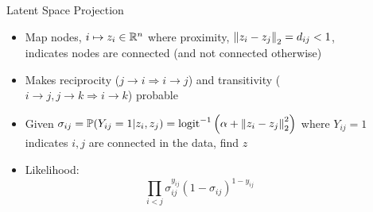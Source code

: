 \documentclass[final]{beamer}
\newlength{\sepwid}
\newlength{\onecolwid}
\newlength{\twocolwid}
\begin{document}
\begin{frame}[t]
\begin{columns}[t]
\begin{column}{\onecolwid}


\end{column} %

\begin{column}{\sepwid}\end{column} %

\begin{column}{\twocolwid} %

\begin{columns}[t,totalwidth=\twocolwid] %

\begin{column}{\onecolwid}\vspace{-.6in} %


  \begin{block}{Latent Space Projection}
    \begin{itemize}
    \item Map nodes, $i\mapsto z_i\in\mathbb{R}^n$ where proximity,
    $\left\|z_i-z_j\right\|_2=d_{ij}<1$, indicates nodes are connected (and not
    connected otherwise)
    \item Makes reciprocity ($j\rightarrow i\Rightarrow i\rightarrow j$) and
    transitivity ($i\rightarrow j, j\rightarrow k\Rightarrow
    i\rightarrow k$) probable
  \item Given $\sigma_{ij} = \mathbb{P}(Y_{ij}=1|z_i,z_j) = \textrm{logit}^{-1}\left(\alpha + \left\|z_i-z_j\right\|_2^2\right)$
    where $Y_{ij}=1$ indicates $i,j$ are connected in the data, find $z$
  \item Likelihood:
    \[\prod_{i<j} \sigma_{ij}^{y_{ij}}(1- \sigma_{ij})^{1-y_{ij}}\]
  \end{itemize}





\end{block}
\end{column}
\end{columns}
\end{column}
\end{columns}
\end{frame}
\end{document}
